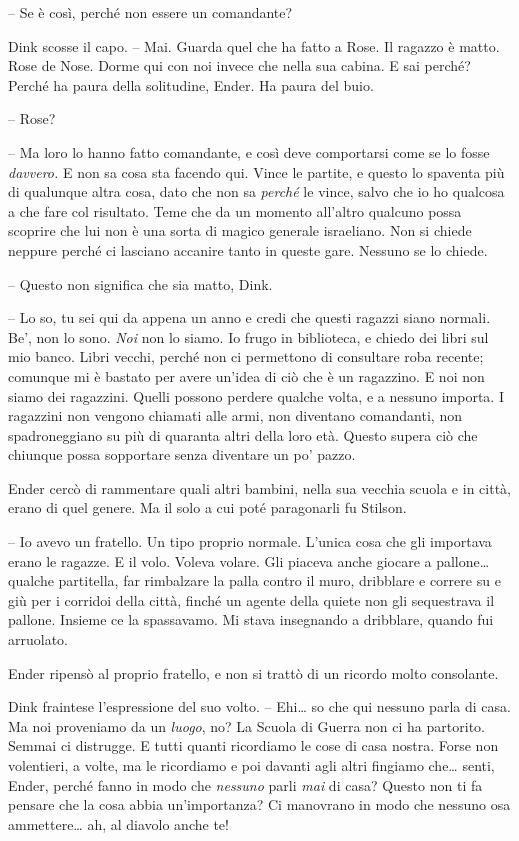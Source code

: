 {-- Se è così, perché non essere un comandante?}

{Dink scosse il capo. -- Mai. Guarda quel che ha fatto a Rose. Il
	ragazzo è matto. Rose de Nose. Dorme qui con noi invece che nella sua
	cabina. E sai perché? Perché ha paura della solitudine, Ender. Ha paura
	del buio.}

{-- Rose?}

{-- Ma loro lo hanno fatto comandante, e così deve comportarsi come se
	lo fosse \emph{davvero.} E non sa cosa sta facendo qui. Vince le
	partite, e questo lo spaventa più di qualunque altra cosa, dato che non
	sa \emph{perché} le vince, salvo che io ho qualcosa a che fare col
	risultato. Teme che da un momento all'altro qualcuno possa scoprire che
	lui non è una sorta di magico generale israeliano. Non si chiede neppure
	perché ci lasciano accanire tanto in queste gare. Nessuno se lo chiede.}

{-- Questo non significa che sia matto, Dink.}

{-- Lo so, tu sei qui da appena un anno e credi che questi ragazzi siano
	normali. Be', non lo sono. \emph{Noi} non lo siamo. Io frugo in
	biblioteca, e chiedo dei libri sul mio banco. Libri vecchi, perché non
	ci permettono di consultare roba recente; comunque mi è bastato per
	avere un'idea di ciò che è un ragazzino. E noi non siamo dei ragazzini.
	Quelli possono perdere qualche volta, e a nessuno importa. I ragazzini
	non vengono chiamati alle armi, non diventano comandanti, non
	spadroneggiano su più di quaranta altri della loro età. Questo supera
	ciò che chiunque possa sopportare senza diventare un po' pazzo.}

{Ender cercò di rammentare quali altri bambini, nella sua vecchia scuola
	e in città, erano di quel genere. Ma il solo a cui poté paragonarli fu
	Stilson.}

{-- Io avevo un fratello. Un tipo proprio normale. L'unica cosa che gli
	importava erano le ragazze. E il volo. Voleva volare. Gli piaceva anche
	giocare a pallone\ldots{} qualche partitella, far rimbalzare la palla
	contro il muro, dribblare e correre su e giù per i corridoi della città,
	finché un agente della quiete non gli sequestrava il pallone. Insieme ce
	la spassavamo. Mi stava insegnando a dribblare, quando fui arruolato.}

{Ender ripensò al proprio fratello, e non si trattò di un ricordo molto
	consolante.}

{Dink fraintese l'espressione del suo volto. -- Ehi\ldots{} so che qui
	nessuno parla di casa. Ma noi proveniamo da un \emph{luogo}, \emph{} no?
	La Scuola di Guerra non ci ha partorito. Semmai ci distrugge. E tutti
	quanti ricordiamo le cose di casa nostra. Forse non volentieri, a volte,
	ma le ricordiamo e poi davanti agli altri fingiamo che\ldots{} senti,
	Ender, perché fanno in modo che \emph{nessuno} parli \emph{mai} di casa?
	Questo non ti fa pensare che la cosa abbia un'importanza? Ci manovrano
	in modo che nessuno osa ammettere\ldots{} ah, al diavolo anche te!}


